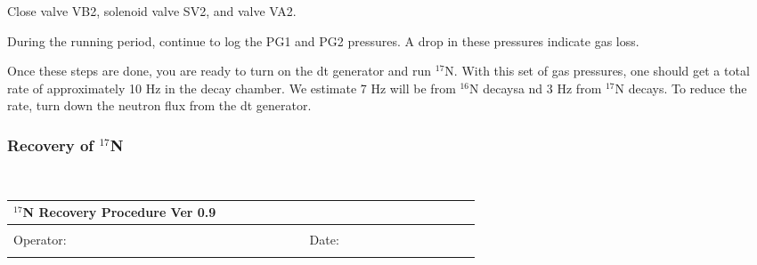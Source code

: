 \begin{enumerate}
\checkitem Close valve VB2, solenoid valve SV2, and valve VA2.
  

\checkitem  During the running period, continue to log the
  PG1 and PG2 pressures.  A drop in these pressures indicate
  gas loss.

\end{enumerate}

Once these steps are done, you are ready to turn on the dt generator 
and run $^{17}$N.  With this set of gas pressures, one should get a
total rate of approximately 10 Hz in the decay chamber.  We estimate
7 Hz will be from $^{16}$N decaysa nd 3 Hz from $^{17}$N decays.  To
reduce the rate, turn down the neutron flux from the dt generator.




\newpage
\subsubsection{Recovery of $^{17}$N}
~\\
\begin{tabular}{|l|l|}
\hline
\multicolumn{2}{|l|}{\bf $^{17}$N Recovery Procedure Ver 0.9}\\
\hline
 & \\
Operator:~~~~~~~~~~~~~~~~~~~~~~~~~~~~~~~~~~~~~ & Date: ~~~~~~~~~~~~~~~~~~~~\\
 & \\
\hline
\end{tabular} \\

